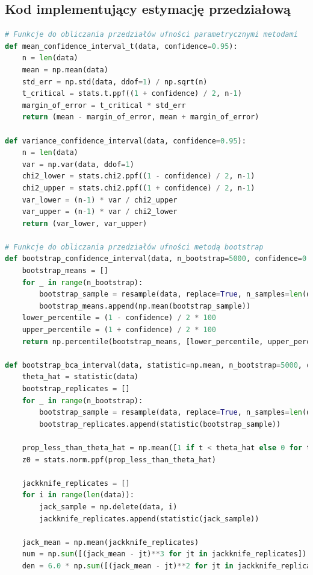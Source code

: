 \documentclass[12pt,a4paper]{article}
\begin{document}
\subsection{Kod implementujący estymację przedziałową}
\begin{lstlisting}[language=Python, caption=Funkcje do obliczania przedziałów ufności]
# Funkcje do obliczania przedziałów ufności parametrycznymi metodami
def mean_confidence_interval_t(data, confidence=0.95):
    n = len(data)
    mean = np.mean(data)
    std_err = np.std(data, ddof=1) / np.sqrt(n)
    t_critical = stats.t.ppf((1 + confidence) / 2, n-1)
    margin_of_error = t_critical * std_err
    return (mean - margin_of_error, mean + margin_of_error)

def variance_confidence_interval(data, confidence=0.95):
    n = len(data)
    var = np.var(data, ddof=1)
    chi2_lower = stats.chi2.ppf((1 - confidence) / 2, n-1)
    chi2_upper = stats.chi2.ppf((1 + confidence) / 2, n-1)
    var_lower = (n-1) * var / chi2_upper
    var_upper = (n-1) * var / chi2_lower
    return (var_lower, var_upper)

# Funkcje do obliczania przedziałów ufności metodą bootstrap
def bootstrap_confidence_interval(data, n_bootstrap=5000, confidence=0.95):
    bootstrap_means = []
    for _ in range(n_bootstrap):
        bootstrap_sample = resample(data, replace=True, n_samples=len(data))
        bootstrap_means.append(np.mean(bootstrap_sample))
    lower_percentile = (1 - confidence) / 2 * 100
    upper_percentile = (1 + confidence) / 2 * 100
    return np.percentile(bootstrap_means, [lower_percentile, upper_percentile])

def bootstrap_bca_interval(data, statistic=np.mean, n_bootstrap=5000, confidence=0.95):
    theta_hat = statistic(data)
    bootstrap_replicates = []
    for _ in range(n_bootstrap):
        bootstrap_sample = resample(data, replace=True, n_samples=len(data))
        bootstrap_replicates.append(statistic(bootstrap_sample))
    
    prop_less_than_theta_hat = np.mean([1 if t < theta_hat else 0 for t in bootstrap_replicates])
    z0 = stats.norm.ppf(prop_less_than_theta_hat)
    
    jackknife_replicates = []
    for i in range(len(data)):
        jack_sample = np.delete(data, i)
        jackknife_replicates.append(statistic(jack_sample))
    
    jack_mean = np.mean(jackknife_replicates)
    num = np.sum([(jack_mean - jt)**3 for jt in jackknife_replicates])
    den = 6.0 * np.sum([(jack_mean - jt)**2 for jt in jackknife_replicates])**1.5
    

\end{lstlisting}
\end{document}
